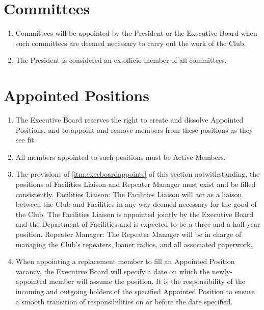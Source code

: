 \documentclass[12pt,letterpaper,oneside]{book}
\begin{document}
\chapter{Committees}

\begin{enumerate}

\item Committees will be appointed by the President or the Executive Board when such committees are deemed necessary to carry out the work of the Club.
\item The President is considered an ex-officio member of all committees.

\end{enumerate}

\chapter{Appointed Positions}

\begin{enumerate}

\item \label{itm:execboardappoints} The Executive Board reserves the right to create and dissolve Appointed Positions, and to appoint and remove members from these positions as they see fit.
\item All members appointed to such positions must be Active Members.
\item The provisions of \cref{itm:execboardappoints} of this section notwithstanding, the positions of Facilities Liaison and Repeater Manager must exist and be filled consistently.
\subitem Facilities Liaison: The Facilities Liaison will act as a liaison between the Club and Facilities in any way deemed necessary for the good of the Club. The Facilities Liaison is appointed jointly by the Executive Board and the Department of Facilities and is expected to be a three and a half year position.
\subitem Repeater Manager: The Repeater Manager will be in charge of managing the Club’s repeaters, loaner radios, and all associated paperwork.
\item \label{itm:appointeddates} When appointing a replacement member to fill an Appointed Position vacancy, the Executive Board will specify a date on which the newly-appointed member will assume the position. It is the responsibility of the incoming and outgoing holders of the specified Appointed Position to ensure a smooth transition of responsibilities on or before the date specified.

\end{enumerate}
\end{document}
